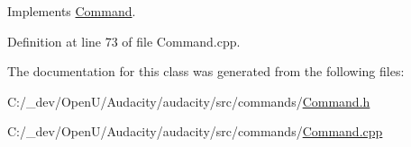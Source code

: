 Implements \hyperlink{class_command_ab3c00e81a4ed48c40730bc39399d65b7}{Command}.



Definition at line 73 of file Command.\+cpp.



The documentation for this class was generated from the following files\+:\begin{DoxyCompactItemize}
\item 
C\+:/\+\_\+dev/\+Open\+U/\+Audacity/audacity/src/commands/\hyperlink{_command_8h}{Command.\+h}\item 
C\+:/\+\_\+dev/\+Open\+U/\+Audacity/audacity/src/commands/\hyperlink{_command_8cpp}{Command.\+cpp}\end{DoxyCompactItemize}

